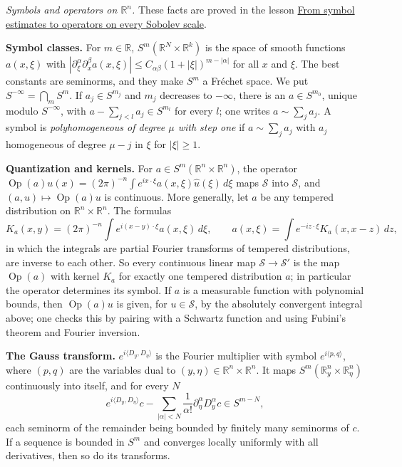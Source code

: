 \documentclass[
  11pt,
]{article}
\begin{document}
\emph{Symbols and operators on \(\mathbb R^n\).} These facts are proved
in the lesson \href{euclidean-symbol-calculus.pdf}{From symbol estimates
to operators on every Sobolev scale}.

\textbf{Symbol classes.} For \(m\in\mathbb R\),
\(S^m(\mathbb R^N\times\mathbb R^k)\) is the space of smooth functions
\(a(x,\xi)\) with
\(|\partial_\xi^\alpha\partial_x^\beta a(x,\xi)|\leq C_{\alpha\beta}(1+|\xi|)^{m-|\alpha|}\)
for all \(x\) and \(\xi\). The best constants are seminorms, and they
make \(S^m\) a Fréchet space. We put \(S^{-\infty}=\bigcap_mS^m\). If
\(a_j\in S^{m_j}\) and \(m_j\) decreases to \(-\infty\), there is an
\(a\in S^{m_0}\), unique modulo \(S^{-\infty}\), with
\(a-\sum_{j<l}a_j\in S^{m_l}\) for every \(l\); one writes
\(a\sim\sum_ja_j\). A symbol is \emph{polyhomogeneous of degree \(\mu\)
with step one} if \(a\sim\sum_ja_j\) with \(a_j\) homogeneous of degree
\(\mu-j\) in \(\xi\) for \(|\xi|\geq1\).

{\small\sloppy
\textbf{Quantization and kernels.} For
\(a\in S^m(\mathbb R^n\times\mathbb R^n)\), the operator
\(\operatorname{Op}(a)u(x)=(2\pi)^{-n}\int e^{ix\cdot\xi}a(x,\xi)\widehat u(\xi)\,d\xi\)
maps \(\mathcal S\) into \(\mathcal S\), and
\((a,u)\mapsto\operatorname{Op}(a)u\) is continuous. More generally, let
\(a\) be any tempered distribution on \(\mathbb R^n\times\mathbb R^n\).
The formulas \[
K_a(x,y)=(2\pi)^{-n}\int e^{i(x-y)\cdot\xi}a(x,\xi)\,d\xi ,\qquad a(x,\xi)=\int e^{-iz\cdot\xi}K_a(x,x-z)\,dz ,
\] in which the integrals are partial Fourier transforms of tempered
distributions, are inverse to each other. So every continuous linear map
\(\mathcal S\to\mathcal S'\) is the map \(\operatorname{Op}(a)\) with
kernel \(K_a\) for exactly one tempered distribution \(a\); in
particular the operator determines its symbol. If \(a\) is a measurable
function with polynomial bounds, then \(\operatorname{Op}(a)u\) is
given, for \(u\in\mathcal S\), by the absolutely convergent integral
above; one checks this by pairing with a Schwartz function and using
Fubini's theorem and Fourier inversion.
\par}

\textbf{The Gauss transform.} \(e^{i\langle D_y,D_\eta\rangle}\) is the
Fourier multiplier with symbol \(e^{i\langle p,q\rangle}\), where
\((p,q)\) are the variables dual to
\((y,\eta)\in\mathbb R^n\times\mathbb R^n\). It maps
\(S^m(\mathbb R^n_y\times\mathbb R^n_\eta)\) continuously into itself,
and for every \(N\) \[
e^{i\langle D_y,D_\eta\rangle}c-\sum_{|\alpha|<N}\frac1{\alpha!}\partial_\eta^\alpha D_y^\alpha c\in S^{m-N},
\] each seminorm of the remainder being bounded by finitely many
seminorms of \(c\). If a sequence is bounded in \(S^m\) and converges
locally uniformly with all derivatives, then so do its transforms.
\end{document}
